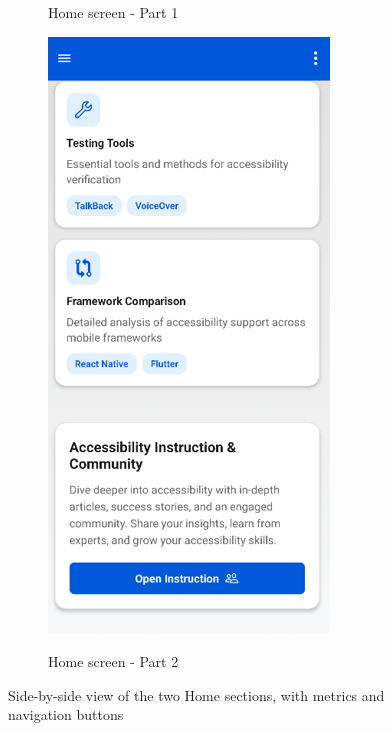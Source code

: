 \begin{figure}[ht]
\begin{subfigure}[b]{0.37\textwidth}
        \caption{Home screen - Part 1}
        \label{fig:home-left}
    \end{subfigure}
    \hfill
    \begin{subfigure}[b]{0.37\textwidth}
        \centering
        \includegraphics[width=\linewidth, alt={Second part of the Home screen}]{img/home2.png}
        \caption{Home screen - Part 2}
        \label{fig:home-right}
    \end{subfigure}
    \caption{Side-by-side view of the two Home sections, with metrics and navigation buttons}
    \label{fig:home_screens_sidebyside}
\end{figure}

